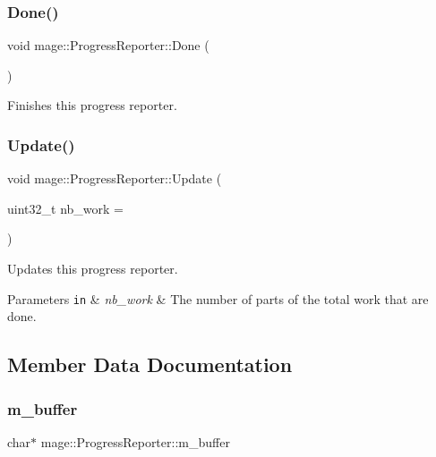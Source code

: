 \subsubsection{\texorpdfstring{Done()}{Done()}}
{\footnotesize\ttfamily void mage\+::\+Progress\+Reporter\+::\+Done (\begin{DoxyParamCaption}{ }\end{DoxyParamCaption})}

Finishes this progress reporter. \hypertarget{classmage_1_1_progress_reporter_a0a5f99f15e4152da9a3d6aadd888244a}{}\label{classmage_1_1_progress_reporter_a0a5f99f15e4152da9a3d6aadd888244a} 
\subsubsection{\texorpdfstring{Update()}{Update()}}
{\footnotesize\ttfamily void mage\+::\+Progress\+Reporter\+::\+Update (\begin{DoxyParamCaption}\item[{uint32\+\_\+t}]{nb\+\_\+work = {} }\end{DoxyParamCaption})}

Updates this progress reporter.


\begin{DoxyParams}[1]{Parameters}
\mbox{\tt in}  & {\em nb\+\_\+work} & The number of parts of the total work that are done. \\
\hline
\end{DoxyParams}


\subsection{Member Data Documentation}
\hypertarget{classmage_1_1_progress_reporter_a3aa49d5b886263402d9a9ecb4851670c}{}\label{classmage_1_1_progress_reporter_a3aa49d5b886263402d9a9ecb4851670c} 
\subsubsection{\texorpdfstring{m\+\_\+buffer}{m\_buffer}}
{\footnotesize\ttfamily char$\ast$ mage\+::\+Progress\+Reporter\+::m\+\_\+buffer\hspace{0.3cm}{\ttfamily [protected]}}

